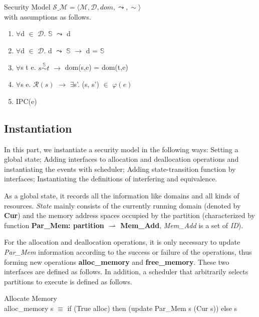 \documentclass[runningheads]{llncs}
\newcommand{\equidom}[3]{{#1}\stackrel{#2}{\sim}{#3}}
\newcommand{\interf}{\leadsto}
\begin{document}
\begin{definition} {Security Model} $\mathcal{S\_M} = \langle \mathcal{M}, \mathcal{D}, dom, \interf, \sim \rangle$ \\
with assumptions as follows.
\begin{enumerate}
\item $\forall$d $\in$ $\mathcal{D}$. $\mathbb{S}$ $\interf$ d
\item $\forall$d $\in$ $\mathcal{D}$. d $\interf$ $\mathbb{S}$ $\longrightarrow$ d = $\mathbb{S}$
\item $\forall$s t e. $\equidom{s}{\mathbb{S}}{t}$ $\longrightarrow$ dom(s,e) = dom(t,e)
\item $\forall$s e. $\mathcal{R}(s)$ $\longrightarrow$ $\exists$s'. (s, s') $\in$ $\varphi(e)$
\item IPC(e)
\end{enumerate}
\end{definition}

\subsection{Instantiation}
In this part, we instantiate a security model in the following ways: Setting a global state; Adding interfaces to allocation and deallocation operations and instantiating the events with scheduler; Adding state-transition function by interfaces; Instantiating the definitions of interfering and equivalence.

As a global state, it records all the information like domains and all kinds of resources. \emph{State} mainly consists of the currently running domain (denoted by \textbf{Cur}) and the memory address spaces occupied by the partition (characterized by function \textbf{Par\_Mem: partition $\rightharpoonup$ Mem\_Add}, \emph{Mem\_Add} is a set of \emph{ID}).

For the allocation and deallocation operations, it is only necessary to update \emph{Par\_Mem} information according to the success or failure of the operations, thus forming new operations \textbf{alloc\_memory} and \textbf{free\_memory}. These two interfaces are defined as follows. In addition, a scheduler that arbitrarily selects partitions to execute is defined as follows.

\begin{definition} {Allocate Memory} \\
alloc\_memory s $\equiv$ if (True alloc) then (update Par\_Mem s (Cur s)) else s
\end{definition}
\end{document}
